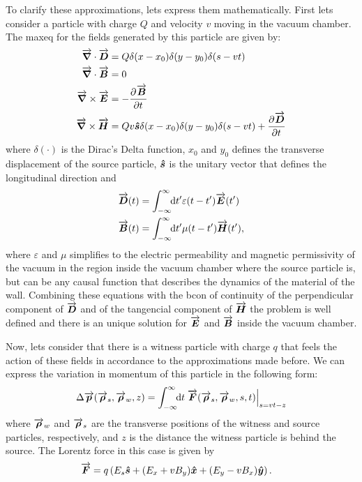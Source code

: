     To clarify these approximations, lets express them mathematically. First lets consider a particle with charge $Q$ and velocity $v$  moving in the vacuum chamber. The \gls{maxeq} for the fields generated by this particle are given by:
    \begin{align}\label{eq:maxeq}
	  	\nonumber
      	\overrightarrow{\boldsymbol{\nabla}}\cdot\overrightarrow{\boldsymbol{D}} &= Q\delta(x-x_0)\delta(y-y_0)\delta(s-vt)\\ \nonumber
	  	\overrightarrow{\boldsymbol{\nabla}}\cdot\overrightarrow{\boldsymbol{B}} &= 0\\
	  	\overrightarrow{\boldsymbol{\nabla}}\times\overrightarrow{\boldsymbol{E}} &= -\frac{\partial^{{}}\overrightarrow{\boldsymbol{B}}}{\partial t^{{}}}\\
	  	\nonumber
	  	\overrightarrow{\boldsymbol{\nabla}}\times\overrightarrow{\boldsymbol{H}} &= Qv\boldsymbol{\hat s}\delta(x-x_0)\delta(y-y_0)\delta(s-vt) + 		\frac{\partial^{{}}\overrightarrow{\boldsymbol{D}}}{\partial t^{{}}}
    \end{align}
    where $\delta(\cdot)$ is the Dirac's Delta function, $x_0$ and $y_0$ defines the transverse displacement of the source particle, $\boldsymbol{\hat s}$ is the unitary vector that defines the longitudinal direction and
    \begin{align}
  	  	\overrightarrow{\boldsymbol{D}}(t) &= \int_{-\infty}^{\infty}\!\!\text{d}t' \varepsilon(t-t')\overrightarrow{\boldsymbol{E}}(t')\\
	  	\overrightarrow{\boldsymbol{B}}(t) &= \int_{-\infty}^{\infty}\!\!\text{d}t' \mu(t-t')\overrightarrow{\boldsymbol{H}}(t'),
    \end{align}
    where $\varepsilon$ and $\mu$ simplifies to the electric permeability and magnetic permissivity of the vacuum in the region inside the vacuum chamber where the source particle is, but can be any causal function that describes the dynamics of the material of the wall. Combining these equations with the \gls{bcon} of continuity of the perpendicular component of $\overrightarrow{\boldsymbol{D}}$ and of the tangencial component of $\overrightarrow{\boldsymbol{H}}$ the problem is well defined and there is an unique solution for $\overrightarrow{\boldsymbol{E}}$ and $\overrightarrow{\boldsymbol{B}}$ inside the vacuum chamber.

    Now, lets consider that there is a witness particle with charge $q$ that feels the action of these fields in accordance to the approximations made before. We can express the variation in momentum of this particle in the following form:
    \begin{align}\label{eq:momentum_gain}
  	  	\Delta \overrightarrow{\boldsymbol{p}}(\overrightarrow{\boldsymbol{\rho}}_s, \overrightarrow{\boldsymbol{\rho}}_w, z) = \int_{-\infty}^{\infty}\!\!\text{d}t \left.\overrightarrow{\boldsymbol{F}}(\overrightarrow{\boldsymbol{\rho}}_s, \overrightarrow{\boldsymbol{\rho}}_w, s, t)\right|_{s=vt-z}
    \end{align}
    where $\overrightarrow{\boldsymbol{\rho}}_w$ and $\overrightarrow{\boldsymbol{\rho}}_s$ are the transverse positions of the witness and source particles, respectively, and $z$ is the distance the witness particle is behind the source. The Lorentz force in this case is given by
    \begin{align}\label{eq:lorentz_force}
  	  	\overrightarrow{\boldsymbol{F}} &= q\left(E_s\boldsymbol{\hat s} + (E_x+vB_y)\boldsymbol{\hat x} + (E_y-vB_x)\boldsymbol{\hat y}\right).
    \end{align}

